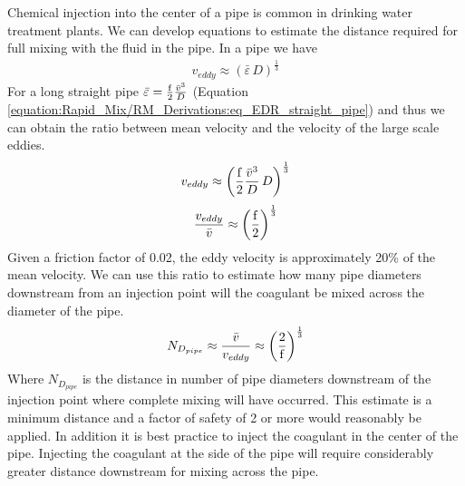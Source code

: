 \documentclass[letterpaper,10pt,english]{sphinxmanual}
\begin{document}
Chemical injection into the center of a pipe is common in drinking water treatment plants. We can develop equations to estimate the distance required for full mixing with the fluid in the pipe. In a pipe we have
\begin{equation}\label{equation:Rapid_Mix/RM_Derivations:Rapid_Mix/RM_Derivations:40}
\begin{split}v_{eddy} \approx \left( \bar\varepsilon \, D \right)^\frac{1}{3}\end{split}
\end{equation}
For a long straight pipe
\(\bar\varepsilon = \frac{{\rm f}}{2} \frac{\bar v^3}{D}\) (Equation \eqref{equation:Rapid_Mix/RM_Derivations:eq_EDR_straight_pipe}) and thus we can obtain the ratio between mean velocity and the velocity of the large scale eddies.
\begin{equation}\label{equation:Rapid_Mix/RM_Derivations:Rapid_Mix/RM_Derivations:41}
\begin{split}v_{eddy} \approx \left( \frac{{\rm f}}{2} \frac{\bar v^3}{D} \, D \right)^\frac{1}{3}\end{split}
\end{equation}\begin{equation}\label{equation:Rapid_Mix/RM_Derivations:Rapid_Mix/RM_Derivations:42}
\begin{split}\frac{v_{eddy}}{\bar v} \approx \left( \frac{{\rm f}}{2}   \right)^\frac{1}{3}\end{split}
\end{equation}
Given a friction factor of 0.02, the eddy velocity is approximately 20\% of the mean velocity. We can use this ratio to estimate how many pipe diameters downstream from an injection point will the coagulant be mixed across the diameter of the pipe.
\begin{equation}\label{equation:Rapid_Mix/RM_Derivations:Rapid_Mix/RM_Derivations:43}
\begin{split}N_{D_{pipe}} \approx \frac{\bar v}{v_{eddy}} \approx \left(\frac{2}{{\rm f}} \right)^\frac{1}{3}\end{split}
\end{equation}
Where \(N_{D_{pipe}}\) is the distance in number of pipe diameters downstream of the injection point where complete mixing will have occurred. This estimate is a minimum distance and a factor of safety of 2 or more would reasonably be applied. In addition it is best practice to inject the coagulant in the center of the pipe. Injecting the coagulant at the side of the pipe will require considerably greater distance downstream for mixing across the pipe.
\end{document}
